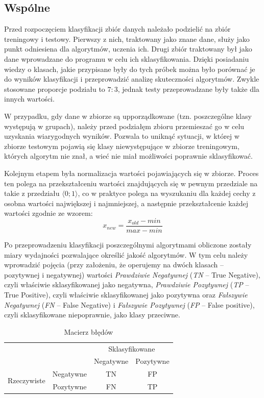 \documentclass[12pt,a4paper]{article}
\begin{document}
	    \subsection{Wspólne}
        	Przed rozpoczęciem klasyfikacji zbiór danych należało podzielić na zbiór treningowy i testowy. Pierwszy z nich, traktowany jako znane dane, służy jako punkt odniesiena dla algorytmów, uczenia ich. Drugi zbiór traktowany był jako dane wprowadzane do programu w celu ich sklasyfikowania. Dzięki posiadaniu wiedzy o klasach, jakie przypisane były do tych próbek można było porównać je do wyników klasyfikacji i przeprowadzić analizę skuteczności algorytmów. Zwykle stosowane proporcje podziału to $7:3$, jednak testy przeprowadzane były także dla innych wartości.
        	
        	W przypadku, gdy dane w zbiorze są upporządkowane (tzn. poszczególne klasy występują w grupach), należy przed podziałęm zbioru przemieszać go w celu uzyskania wiarygodnych wyników. Pozwala to uniknąć sytuacji, w której w zbiorze testowym pojawią się klasy niewystępujące w zbiorze treningowym, których algorytm nie znał, a wieć nie miał możliwości poprawnie sklasyfikować.
        	
        	Kolejnym etapem była normalizacja wartości pojawiających się w zbiorze. Proces ten polega na przekształceniu wartości znajdujących się w pewnym przedziale na takie z przedziału $\langle 0;1 \rangle$, co w praktyce polega na wyszukaniu dla każdej cechy z osobna wartości największej i najmniejszej, a następnie przekształcenie każdej wartości zgodnie ze wzorem:
        	    $$x_{new}=\frac{x_{old}-min}{max-min}$$
        	
        	Po przeprowadzeniu klasyfikacji poszczególnymi algorytmami obliczone zostały miary wydajności pozwalające określić jakość algorytmów. W tym celu należy wprowadzić pojęcia (przy założeniu, że operujemy na dwóch klasach -- pozytywnej i negatywnej) wartości \textit{Prawdziwie Negatywnej} (\textit{TN} -- True Negative), czyli właściwie sklasyfikowanej jako negatywna, \textit{Prawdziwie Pozytywnej} (\textit{TP} -- True Positive), czyli właściwie sklasyfikowanej jako pozytywna oraz \textit{Fałszywie Negatywnej} (\textit{FN} -- False Negative) i \textit{Fałszywie Pozytywnej} (\textit{FP} -- False positive), czyli sklasyfikowane niepoprawnie, jako klasy przeciwne.
        	\begin{table}[h!]
        	    \centering
        	    \begin{tabular}{c c || c | c}
                    \multicolumn{2}{c}{} & \multicolumn{2}{c}{Sklasyfikowane} \\
                    ~ & ~ & Negatywne & Pozytywne \\
                    \hline \hline
                    \multirow{2}{5em}{Rzeczywiste} & Negatywne & TN & FP \\
                     & Pozytywne & FN & TP \\
                \end{tabular}
        	    \caption{Macierz błędów}
        	    \label{tab:matrix}
        	\end{table}
        	
\end{document}
